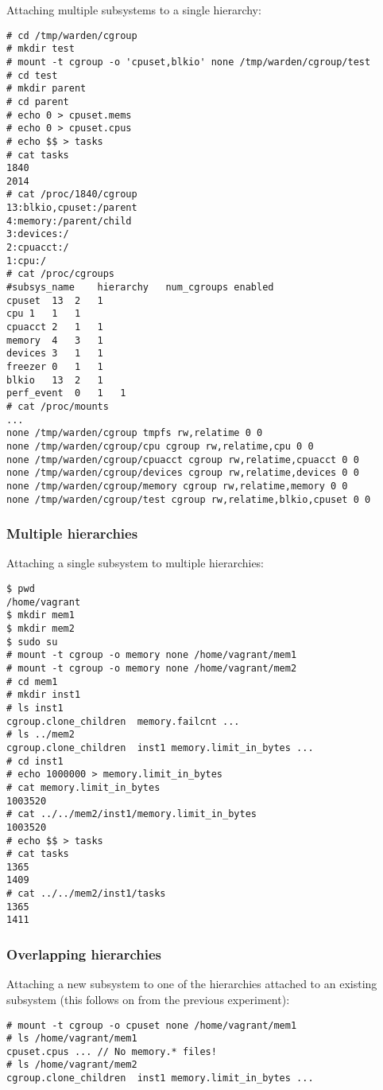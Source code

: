 \documentclass[a4paper,twoside,12pt]{article}
\begin{document}
Attaching multiple subsystems to a single hierarchy:
{\scriptsize \begin{verbatim}
# cd /tmp/warden/cgroup
# mkdir test
# mount -t cgroup -o 'cpuset,blkio' none /tmp/warden/cgroup/test
# cd test
# mkdir parent
# cd parent
# echo 0 > cpuset.mems
# echo 0 > cpuset.cpus
# echo $$ > tasks
# cat tasks
1840
2014
# cat /proc/1840/cgroup
13:blkio,cpuset:/parent
4:memory:/parent/child
3:devices:/
2:cpuacct:/
1:cpu:/
# cat /proc/cgroups
#subsys_name	hierarchy	num_cgroups	enabled
cpuset	13	2	1
cpu	1	1	1
cpuacct	2	1	1
memory	4	3	1
devices	3	1	1
freezer	0	1	1
blkio	13	2	1
perf_event	0	1	1
# cat /proc/mounts
...
none /tmp/warden/cgroup tmpfs rw,relatime 0 0
none /tmp/warden/cgroup/cpu cgroup rw,relatime,cpu 0 0
none /tmp/warden/cgroup/cpuacct cgroup rw,relatime,cpuacct 0 0
none /tmp/warden/cgroup/devices cgroup rw,relatime,devices 0 0
none /tmp/warden/cgroup/memory cgroup rw,relatime,memory 0 0
none /tmp/warden/cgroup/test cgroup rw,relatime,blkio,cpuset 0 0
\end{verbatim}}

\subsubsection{Multiple hierarchies}

Attaching a single subsystem to multiple hierarchies:
{\scriptsize \begin{verbatim}
$ pwd
/home/vagrant
$ mkdir mem1
$ mkdir mem2
$ sudo su
# mount -t cgroup -o memory none /home/vagrant/mem1
# mount -t cgroup -o memory none /home/vagrant/mem2
# cd mem1
# mkdir inst1
# ls inst1
cgroup.clone_children  memory.failcnt ...
# ls ../mem2
cgroup.clone_children  inst1 memory.limit_in_bytes ...
# cd inst1
# echo 1000000 > memory.limit_in_bytes
# cat memory.limit_in_bytes
1003520
# cat ../../mem2/inst1/memory.limit_in_bytes
1003520
# echo $$ > tasks
# cat tasks
1365
1409
# cat ../../mem2/inst1/tasks
1365
1411
\end{verbatim}}

\subsubsection{Overlapping hierarchies}

Attaching a new subsystem to one of the hierarchies attached to an existing subsystem (this follows on from the previous experiment):
{\scriptsize \begin{verbatim}
# mount -t cgroup -o cpuset none /home/vagrant/mem1
# ls /home/vagrant/mem1
cpuset.cpus ... // No memory.* files!
# ls /home/vagrant/mem2
cgroup.clone_children  inst1 memory.limit_in_bytes ...
\end{verbatim}}
\end{document}
